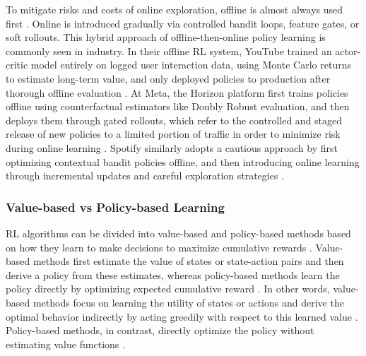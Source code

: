 \documentclass[final]{anthology-ch}         %
\begin{document}
To mitigate risks and costs of online exploration, offline is almost always used first \cite{levine2020offline}. Online is introduced gradually via controlled bandit loops, feature gates, or soft rollouts. This hybrid approach of offline-then-online policy learning is commonly seen in industry. In their offline RL system, YouTube trained an actor-critic model entirely on logged user interaction data, using Monte Carlo returns to estimate long-term value, and only deployed policies to production after thorough offline evaluation \cite{chen2022off}. At Meta, the Horizon platform first trains policies offline using counterfactual estimators like Doubly Robust evaluation, and then deploys them through gated rollouts, which refer to the controlled and staged release of new policies to a limited portion of traffic in order to minimize risk during online learning \cite{gauci2018horizon}. Spotify similarly adopts a cautious approach by first optimizing contextual bandit policies offline, and then introducing online learning through incremental updates and careful exploration strategies \cite{Mehrotra2020}.

\subsubsection{Value-based vs Policy-based Learning}

RL algorithms can be divided into value-based and policy-based methods based on how they learn to make decisions to maximize cumulative rewards \cite{Sutton1998, russell2016artificial}. Value-based methods first estimate the value of states or state-action pairs and then derive a policy from these estimates, whereas policy-based methods learn the policy directly by optimizing expected cumulative reward \cite{Sutton1998, schulman2017proximal}. In other words, value-based methods focus on learning the utility of states or actions and derive the optimal behavior indirectly by acting greedily with respect to this learned value \cite{Sutton1998}. Policy-based methods, in contrast, directly optimize the policy without estimating value functions \cite{Sutton1998, schulman2017proximal}. 
\end{document}
